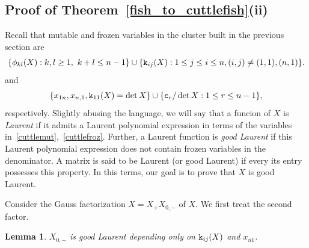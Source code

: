 \documentclass{amsart}
\newtheorem{lemma}[theorem]{Lemma}
\theoremstyle{definition}
\theoremstyle{remark}
\numberwithin{equation}{section}
\numberwithin{theorem}{section}
\def\ec{{\tt c}}
\def\ek{{\tt k}}
\begin{document}
\subsection{Proof of Theorem~\ref{fish_to_cuttlefish}(ii)}
Recall that mutable and frozen variables in the cluster built in the previous section are 
 \begin{equation}\label{cuttlemut}
\{\phi_{kl}(X): k,l \geq 1, \ k+l \leq n-1 \}\cup \{\ek_{ij}(X) : 1\le j \leq i \leq n, (i,j)\ne (1,1), (n,1) \}.
\end{equation}
and
\begin{equation}\label{cuttlefroz}
\{x_{1n}, x_{n,1}, \ek_{11}(X)=\det X\}\cup \{\ec_r/\det X: 1\le r\le n-1\}, 
\end{equation}
respectively. 
Slightly abusing the language, we will say that a funcion of $X$ is {\it Laurent\/} if it admits a Laurent polynomial expression in terms of the variables in~\eqref{cuttlemut},~\eqref{cuttlefroz}. Further, a Laurent function is {\it good Laurent\/} if this Laurent polynomial expression does not contain frozen variables in the denominator. A matrix is said 
to be Laurent (or good Laurent) if every its entry possesses this property. In this terms, our goal is to prove that
$X$ is good Laurent.

Consider the Gauss factorization $X=X_+ X_{0,-}$ of $X$. We first treat the second factor.

\begin{lemma}
\label{lem:X<Laurent}
$X_{0,-}$ is good Laurent depending only on $\ek_{ij}(X)$ and $x_{n1}$.
\end{lemma}
\end{document}
